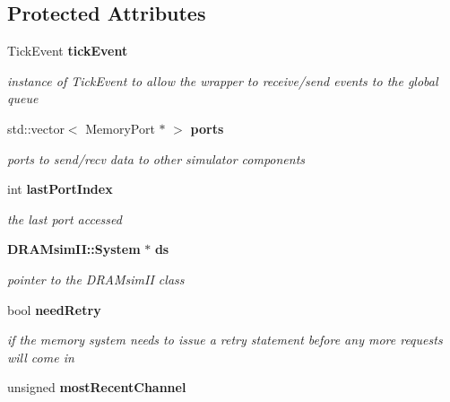 \subsection*{Protected Attributes}
\begin{CompactItemize}
\item 
TickEvent {\bf tickEvent}\label{class_m5dram_system_2c1df40ac4ba1b6ee79a89c36717e6b5}

\begin{CompactList}\small\item\em instance of TickEvent to allow the wrapper to receive/send events to the global queue \item\end{CompactList}\item 
std::vector$<$ MemoryPort $\ast$ $>$ {\bf ports}\label{class_m5dram_system_c74ac86e7c7390068a33e60dfb352427}

\begin{CompactList}\small\item\em ports to send/recv data to other simulator components \item\end{CompactList}\item 
int {\bf lastPortIndex}\label{class_m5dram_system_8dec460f8036d2885f730687e207624c}

\begin{CompactList}\small\item\em the last port accessed \item\end{CompactList}\item 
{\bf DRAMsimII::System} $\ast$ {\bf ds}\label{class_m5dram_system_ce32ccab57bc7bb099862cb701cc6a34}

\begin{CompactList}\small\item\em pointer to the DRAMsimII class \item\end{CompactList}\item 
bool {\bf needRetry}\label{class_m5dram_system_b1c16d57a7d7a3a07c8c0250be821432}

\begin{CompactList}\small\item\em if the memory system needs to issue a retry statement before any more requests will come in \item\end{CompactList}\item 
unsigned {\bf mostRecentChannel}\label{class_m5dram_system_8f2613214d10b04b640bc26db979484b}


\end{CompactItemize}

